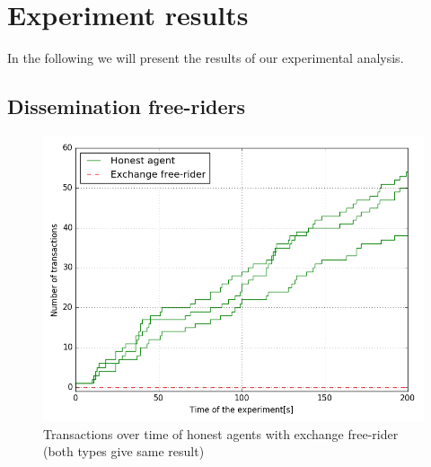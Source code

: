 \section{Experiment results}
In the following we will present the results of our experimental analysis.
\subsection{Dissemination free-riders}


\begin{figure}
  \centering
  \includegraphics[width=.6\linewidth]{images/gossip_free-rider}
  \caption{Transactions over time of honest agents with exchange free-rider (both types give same result)}
  \label{fig:DFR_no_exchanges}
\end{figure}


